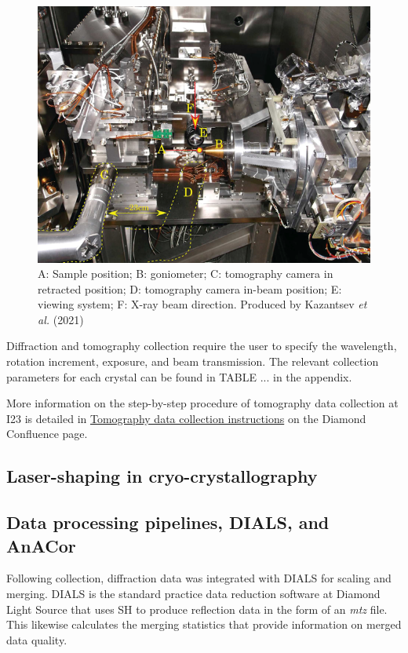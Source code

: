 \begin{figure}
    \centering
    \includegraphics{images/tomo camera.png}
    \caption{A: Sample position; B: goniometer; C: tomography camera in retracted position; D: tomography camera in-beam position; E: viewing system; F: X-ray beam direction. Produced by Kazantsev \textit{et al.} (2021) \cite{Kazantsev2021}}
    \label{fig:vacuum_chamber}
\end{figure}

Diffraction and tomography collection require the user to specify the wavelength, rotation increment, exposure, and beam transmission. The relevant collection parameters for each crystal can be found in TABLE ... in the appendix.

More information on the step-by-step procedure of tomography data collection at I23 is detailed in \href{https://confluence.diamond.ac.uk/x/h4HVDQ}{Tomography data collection instructions} on the Diamond Confluence page.

\subsection{Laser-shaping in cryo-crystallography}

\subsection{Data processing pipelines, DIALS, and AnACor}

Following collection, diffraction data was integrated with DIALS for scaling and merging. DIALS is the standard practice data reduction software at Diamond Light Source that uses SH to produce reflection data in the form of an \textit{mtz} file. This likewise calculates the merging statistics that provide information on merged data quality.%

